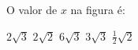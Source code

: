O valor de $x$ na figura \'e:

\parbox{0.3\linewidth}{

$2\sqrt{3}$
$2\sqrt{2}$
$6\sqrt{3}$
$3\sqrt{3}$
$\frac{1}{2}\sqrt{2}$

}\parbox{0.69\linewidth}{
\begin{center}
\vspace{-6mm}
\vspace{-9mm}
\end{center}
}


